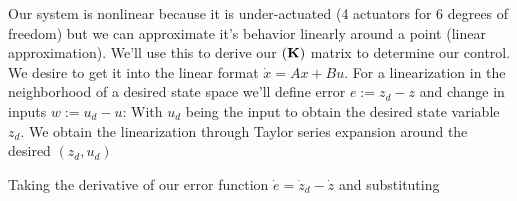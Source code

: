 \documentclass{article}
\begin{document}
Our system is nonlinear because it is under-actuated (4 actuators for 6 degrees of freedom) but we can approximate it's behavior linearly around a point (linear approximation).  We'll use this to derive our $\bf(K)$ matrix to determine our control.  We desire to get it into the linear format $\dot{x} = Ax + Bu$.
\noindent For a linearization in the neighborhood of a desired state space we'll define error $ e :=  z_d-z $ and change in inputs $ w :=  u_d-u $:
With $u_d$ being the input to obtain the desired  state variable $z_d $.  We obtain the linearization through Taylor series expansion around the desired $(z_d,u_d)$

Taking the derivative of our error function $\dot{e}=\dot{z}_d-\dot{z}$ and substituting %
\end{document}
